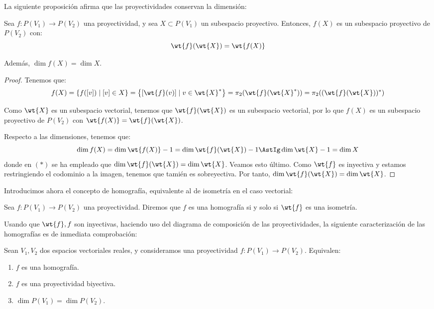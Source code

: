 La siguiente proposición afirma que las proyectividades conservan la dimensión:
\begin{prop}
    Sea $f:P(V_1)\to P(V_2)$ una proyectividad, y sea $X\subset P(V_1)$ un subespacio proyectivo. Entonces, $f(X)$ es un subespacio proyectivo de $P(V_2)$ con:
    \begin{equation*}
        \wt{f}(\wt{X}) = \wt{f(X)}
    \end{equation*}

    Además, $\dim f(X) = \dim X$.
\end{prop}
\begin{proof}
    Tenemos que: $$f(X)=\{f([v]) \mid [v]\in X\} = \left\{\left[\wt{f}(v)\right] \mid v\in \wt{X}^\ast\right\} = \pi_2(\wt{f}(\wt{X}^\ast)) = \pi_2((\wt{f}(\wt{X}))^\ast)$$

    Como $\wt{X}$ es un subespacio vectorial, tenemos que $\wt{f}(\wt{X})$ es un subespacio vectorial, por lo que $f(X)$ es un subespacio proyectivo de $P(V_2)$ con $\wt{f(X)}=\wt{f}(\wt{X})$.

    Respecto a las dimensiones, tenemos que: $$\dim f(X) = \dim \wt{f(X)} - 1 = \dim \wt{f}(\wt{X}) - 1 \AstIg \dim \wt{X} - 1 = \dim X$$
    donde en $(\ast)$ se ha empleado que $\dim \wt{f}(\wt{X}) = \dim \wt{X}$. Veamos esto último. Como $\wt{f}$ es inyectiva y estamos restringiendo el codominio a la imagen, tenemos que tamién es sobreyectiva. Por tanto, $\dim \wt{f}(\wt{X}) = \dim \wt{X}$.
\end{proof}

Introducimos ahora el concepto de homografía, equivalente al de isometría en el caso vectorial:
\begin{definicion}[Homografía]
    Sea $f:P(V_1)\to P(V_2)$ una proyectividad. Diremos que $f$ es una homografía si y solo si $\wt{f}$ es una isometría.
\end{definicion}

Usando que $\wt{f},f$ son inyectivas, haciendo uso del diagrama de composición de las proyectividades, la siguiente caracterización de las homografías es de inmediata comprobación:
\begin{prop}
    Sean $V_1,V_2$ dos espacios vectoriales reales, y consideramos una proyectividad $f:P(V_1)\to P(V_2)$. Equivalen:
    \begin{enumerate}
        \item $f$ es una homografía.
        \item $f$ es una proyectividad biyectiva.
        \item $\dim P(V_1) = \dim P(V_2)$.
    \end{enumerate}
\end{prop}

